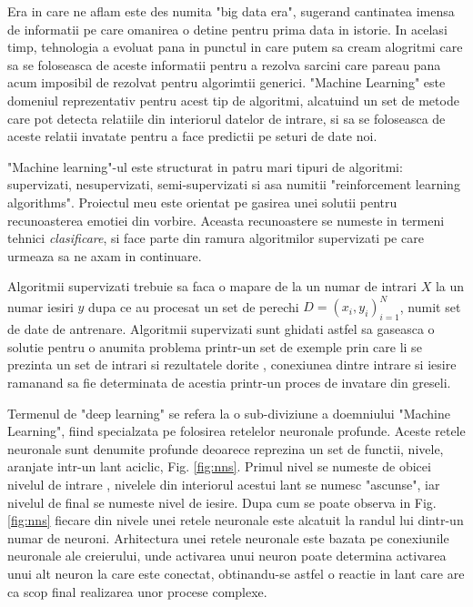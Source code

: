 \documentclass[a4paper,12pt]{book}
\begin{document}
			Era in care ne aflam este des numita "big data era", sugerand cantinatea imensa de informatii pe care omanirea o detine pentru prima data in istorie. In acelasi timp, tehnologia a evoluat pana in punctul in care putem sa cream alogritmi care sa se foloseasca de aceste informatii pentru a rezolva sarcini care pareau pana acum imposibil de rezolvat pentru algorimtii generici. "Machine Learning" este domeniul reprezentativ pentru acest tip de algoritmi, alcatuind un set de metode care pot detecta relatiile din interiorul datelor de intrare, si sa se foloseasca de aceste relatii invatate pentru a face predictii pe seturi de date noi. \par
			
			"Machine learning"-ul este structurat in patru mari tipuri de algoritmi: supervizati, nesupervizati, semi-supervizati si asa numitii "reinforcement learning algorithms". Proiectul meu este orientat pe gasirea unei solutii pentru recunoasterea emotiei din vorbire. Aceasta recunoastere se numeste in termeni tehnici \textit{clasificare}, si face parte din ramura algoritmilor supervizati pe care urmeaza sa ne axam in continuare. \par 
			Algoritmii supervizati trebuie sa faca o mapare de la un numar de intrari $X$ la un numar iesiri $y$ dupa ce au procesat un set de perechi $D={(x_i,y_i)}^N_{i=1}$, numit set de date de antrenare. Algoritmii supervizati sunt ghidati astfel sa gaseasca o solutie pentru o anumita problema printr-un set de exemple prin care li se prezinta un set de intrari si rezultatele dorite , conexiunea dintre intrare si iesire ramanand sa fie determinata de acestia printr-un proces de invatare din greseli. \par
			
			Termenul de "deep learning" se refera la o sub-diviziune a doemniului "Machine Learning", fiind specialzata pe folosirea retelelor neuronale profunde. Aceste retele neuronale sunt denumite profunde deoarece reprezina un set de functii, nivele, aranjate intr-un lant aciclic, Fig. \ref{fig:nns}. Primul nivel se numeste de obicei nivelul de intrare , nivelele din interiorul acestui lant se numesc "ascunse", iar nivelul de final se numeste nivel de iesire. Dupa cum se poate observa in Fig. \ref{fig:nns} fiecare din nivele unei retele neuronale este alcatuit la randul lui dintr-un numar de neuroni. Arhitectura unei retele neuronale este bazata pe conexiunile neuronale ale creierului, unde activarea unui neuron poate determina activarea unui alt neuron la care este conectat, obtinandu-se astfel o reactie in lant care are ca scop final realizarea unor procese complexe. 
			
\end{document}

